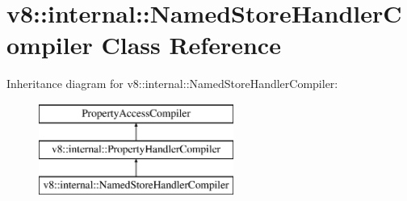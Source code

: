 \hypertarget{classv8_1_1internal_1_1_named_store_handler_compiler}{}\section{v8\+:\+:internal\+:\+:Named\+Store\+Handler\+Compiler Class Reference}
\label{classv8_1_1internal_1_1_named_store_handler_compiler}
Inheritance diagram for v8\+:\+:internal\+:\+:Named\+Store\+Handler\+Compiler\+:\begin{figure}[H]
\begin{center}
\leavevmode
\includegraphics[height=3.000000cm]{classv8_1_1internal_1_1_named_store_handler_compiler}
\end{center}
\end{figure}
